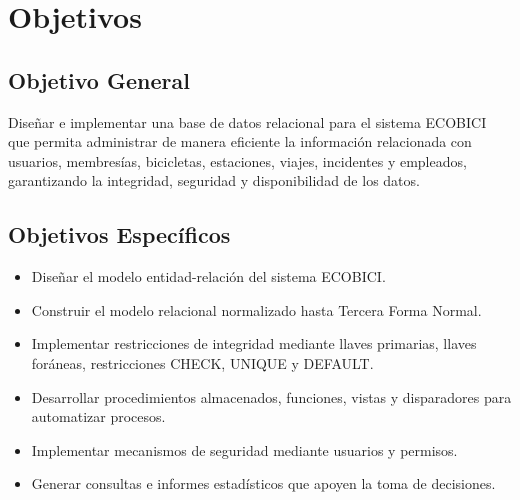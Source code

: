 \section{Objetivos}

\subsection{Objetivo General}

Diseñar e implementar una base de datos relacional para el sistema ECOBICI que permita administrar de manera eficiente la información relacionada con usuarios, membresías, bicicletas, estaciones, viajes, incidentes y empleados, garantizando la integridad, seguridad y disponibilidad de los datos.

\subsection{Objetivos Específicos}

\begin{itemize}
	\item Diseñar el modelo entidad-relación del sistema ECOBICI.
	\item Construir el modelo relacional normalizado hasta Tercera Forma Normal.
	\item Implementar restricciones de integridad mediante llaves primarias, llaves foráneas, restricciones CHECK, UNIQUE y DEFAULT.
	\item Desarrollar procedimientos almacenados, funciones, vistas y disparadores para automatizar procesos.
	\item Implementar mecanismos de seguridad mediante usuarios y permisos.
	\item Generar consultas e informes estadísticos que apoyen la toma de decisiones.
\end{itemize}
